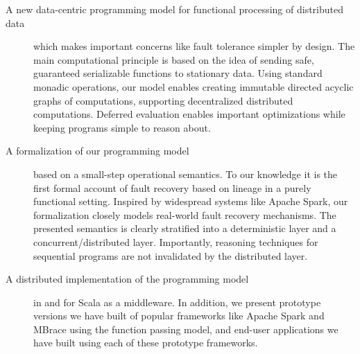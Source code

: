 \documentclass{jfp1}
\begin{document}
\begin{description}
  \item[A new data-centric programming model for functional processing of
    distributed data] which makes important concerns like fault tolerance
    simpler by design. The main computational principle is based on the idea of
    sending safe, guaranteed serializable functions to stationary data. Using
    standard monadic operations, our model enables creating immutable directed
    acyclic graphs of computations, supporting decentralized distributed
    computations. Deferred evaluation enables important optimizations while
    keeping programs simple to reason about.

  \item[A formalization of our programming model] based on a small-step
    operational  semantics. To our knowledge it is the first formal account of
    fault recovery based on lineage in a purely functional setting. Inspired by
    widespread systems like Apache Spark, our formalization closely models
    real-world fault recovery mechanisms. The presented semantics is clearly
    stratified into a deterministic layer and a concurrent/distributed layer.
    Importantly, reasoning techniques for sequential programs are not
    invalidated by the distributed layer.

  \item[A distributed implementation of the programming model] in and for Scala
    as a middleware. In addition, we present prototype versions we have built of
    popular frameworks like Apache Spark and MBrace using the function passing
    model, and end-user applications we have built using each of these prototype
    frameworks.



\end{description}
\end{document}
